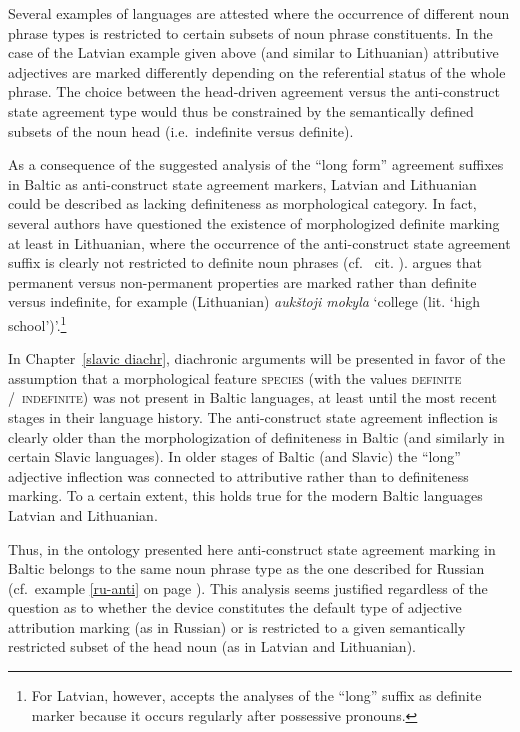 Several examples of languages are attested where the occurrence of different noun phrase types is restricted to certain subsets of noun phrase constituents. In the case of the Latvian example given above (and similar to Lithuanian) attributive adjectives are marked differently depending on the referential status of the whole phrase. The choice between the head-driven agreement versus the anti-construct state agreement type would thus be constrained by the semantically defined subsets of the noun head (i.e.~indefinite versus definite). 

As a consequence of the suggested analysis of the “long form” agreement suffixes in Baltic as anti-construct state agreement markers, Latvian and Lithuanian could be described as lacking definiteness as morphological category. In fact, several authors have questioned the existence of morphologized definite marking at least in Lithuanian, where the occurrence of the anti-construct state agreement suffix is clearly not restricted to definite noun phrases (cf.~\citealt{wissemann1958} cit. \citealt[181–182]{kramsky1972}). \citet[37]{trost1966} argues that permanent versus non-permanent properties are marked rather than definite versus indefinite, for example (Lithuanian) \textit{aukštoji mokyla} ‘college (lit. ‘high school’)’.\footnote{For Latvian, however, \citet[38]{trost1966} accepts the analyses of the “long” suffix as definite marker because it occurs regularly after possessive pronouns.}

In Chapter~\ref{slavic diachr}, diachronic arguments will be presented in favor of the assumption that a morphological feature \textsc{species} (with the values \textsc{definite} /~\textsc{indefinite}) was not present in Baltic languages, at least until the most recent stages in their language history. The anti-construct state agreement inflection is clearly older than the morphologization of definiteness in Baltic (and similarly in certain Slavic languages). In older stages of Baltic (and Slavic) the “long” adjective inflection was connected to attributive rather than to definiteness marking. To a certain extent, this holds true for the modern Baltic languages Latvian and Lithuanian.

Thus, in the ontology presented here anti-construct state agreement marking in Baltic belongs to the same noun phrase type as the one described for Russian (cf.~example \ref{ru-anti} on page \pageref{ru-anti}). This analysis seems justified regardless of the question as to whether the device constitutes the default type of adjective attribution marking (as in Russian) or is restricted to a given semantically restricted subset of the head noun (as in Latvian and Lithuanian).


